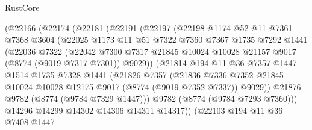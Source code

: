 \begin{lexlean}{RustCore}
\begin{coremodule}
              (@22166
                (@22174
                  (@22181
                    (@22191
                      (@22197
                        (@22198
                          @1174
                          @52
                          @11
                          @7361
                          @7368
                          @3604
                          (@22025
                            @1173
                            @11
                            @51
                            @7322
                            @7360
                            @7367
                            @1735
                            @7292
                            @1441
                            (@22036
                              @7322
                              (@22042
                                @7300
                                @7317
                                @21845
                                @10024
                                @10028
                                @21157
                                @9017
                                (@8774 (@9019 @7317 @7301))
                                @9029))
                            (@21814
                              @194
                              @11
                              @36
                              @7357
                              @1447
                              @1514
                              @1735
                              @7328
                              @1441
                              (@21826
                                @7357
                                (@21836
                                  @7336
                                  @7352
                                  @21845
                                  @10024
                                  @10028
                                  @12175
                                  @9017
                                  (@8774 (@9019 @7352 @7337))
                                  @9029))
                              @21876
                              @9782
                              (@8774 (@9784 @7329 @1447)))
                            @9782
                            (@8774 (@9784 @7293 @7360)))
                          @14296
                          @14299
                          @14302
                          @14306
                          @14311
                          @14317))
                      (@22103
                        @194
                        @11
                        @36
                        @7408
                        @1447

\end{coremodule}
\end{lexlean}
